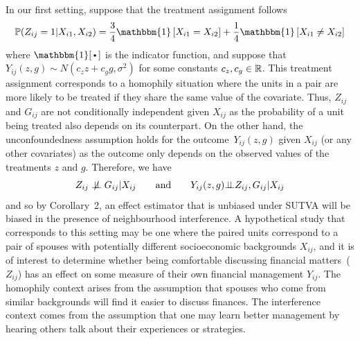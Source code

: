 \documentclass[10pt]{article}
\begin{document}
In our first setting, suppose that the treatment assignment follows
\[
\P(Z_{ij}=1|X_{i1},X_{i2}) = \frac{3}{4}\mathbbm{1}\left[X_{i1}=X_{i2}\right] + \frac{1}{4}\mathbbm{1}\left[X_{i1}\neq X_{i2}\right]
\]
where $\mathbbm{1}[\argdot]$ is the indicator function, and suppose that $Y_{ij}(z,g)\sim N(c_zz+c_gg,\sigma^2)$ for some constants $c_z,c_g\in\mathbb{R}$. This treatment assignment corresponds to a homophily situation where the units in a pair are more likely to be treated if they share the same value of the covariate. Thus, $Z_{ij}$ and $G_{ij}$ are not conditionally independent given $X_{ij}$ as the probability of a unit being treated also depends on its counterpart. On the other hand, the unconfoundedness assumption holds for the outcome~$Y_{ij}(z,g)$ given $X_{ij}$ (or any other covariates) as the outcome only depends on the observed values of the treatments $z$ and $g$. Therefore, we have
\[
Z_{ij}\centernot\condind G_{ij}|X_{ij} \qquad \text{and} \qquad Y_{ij}(z,g)\condind Z_{ij},G_{ij}|X_{ij}
\]
and so by Corollary~2, an effect estimator that is unbiased under SUTVA will be biased in the presence of neighbourhood interference. A hypothetical study that corresponds to this setting may be one where the paired units correspond to a pair of spouses with potentially different socioeconomic backgrounds $X_{ij}$, and it is of interest to determine whether being comfortable discussing financial matters~($Z_{ij}$) has an effect on some measure of their own financial management $Y_{ij}$. The homophily context arises from the assumption that spouses who come from similar backgrounds will find it easier to discuss finances. The interference context comes from the assumption that one may learn better management by hearing others talk about their experiences or strategies.
\\
\end{document}

